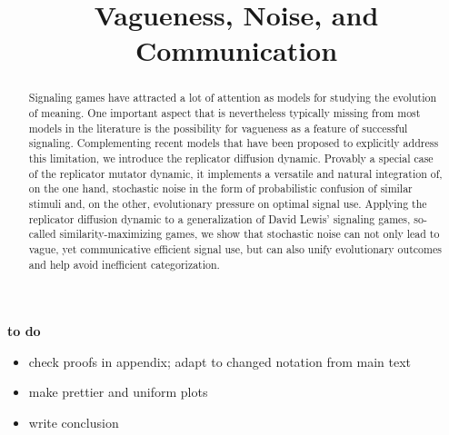 \documentclass[fleqn,reqno,10pt]{article}
\title{Vagueness, Noise, and Communication}
\date{}
\begin{document}
\textbf{to do}

\begin{itemize}
\item check proofs in appendix; adapt to changed notation from main text
\item make prettier and uniform plots
\item write conclusion
\end{itemize}

\newpage

\maketitle

\begin{abstract}
  Signaling games have attracted a lot of attention as models for
  studying the evolution of meaning. One important aspect that is
  nevertheless typically missing from most models in the literature is
  the possibility for vagueness as a feature of successful signaling.
  Complementing recent models that have been proposed to explicitly
  address this limitation, we introduce the replicator diffusion
  dynamic. Provably a special case of the replicator mutator dynamic,
  it implements a versatile and natural integration of, on the one hand, stochastic
  noise in the form of probabilistic confusion of similar stimuli and, on
  the other, evolutionary pressure on optimal signal use.
  Applying the replicator diffusion dynamic to a
  generalization of David Lewis' signaling games, so-called
  similarity-maximizing games, we show that stochastic noise can not
  only lead to vague, yet communicative efficient signal use, but can
  also unify evolutionary outcomes and help avoid inefficient
  categorization.
\end{abstract}














\printbibliography[heading=bibintoc]
\end{document}
